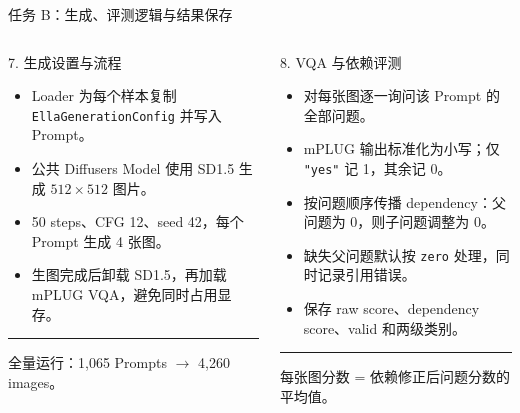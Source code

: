 \documentclass[aspectratio=169,10pt]{beamer}
\begin{document}
\begin{frame}{任务 B：生成、评测逻辑与结果保存}
  \begin{columns}[T,onlytextwidth]
      \begin{block}{7. 生成设置与流程}
        \begin{minipage}[c][5.05cm][c]{\linewidth}
          \begin{itemize}\scriptsize
            \item Loader 为每个样本复制 \texttt{EllaGenerationConfig} 并写入 Prompt。
            \item 公共 Diffusers Model 使用 SD1.5 生成 $512\times512$ 图片。
            \item 50 steps、CFG 12、seed 42，每个 Prompt 生成 4 张图。
            \item 生图完成后卸载 SD1.5，再加载 mPLUG VQA，避免同时占用显存。
          \end{itemize}
          \vspace{0.45em}
          \color{T2IGray}\rule{\linewidth}{0.35pt}\par\vspace{0.3em}
          \scriptsize 全量运行：1,065 Prompts $\rightarrow$ 4,260 images。
        \end{minipage}
      \end{block}

      \begin{block}{8. VQA 与依赖评测}
        \begin{minipage}[c][5.05cm][c]{\linewidth}
          \begin{itemize}\scriptsize
            \item 对每张图逐一询问该 Prompt 的全部问题。
            \item mPLUG 输出标准化为小写；仅 \texttt{"yes"} 记 1，其余记 0。
            \item 按问题顺序传播 dependency：父问题为 0，则子问题调整为 0。
            \item 缺失父问题默认按 \texttt{zero} 处理，同时记录引用错误。
            \item 保存 raw score、dependency score、valid 和两级类别。
          \end{itemize}
          \vspace{0.45em}
          \color{T2IGray}\rule{\linewidth}{0.35pt}\par\vspace{0.3em}
          \scriptsize 每张图分数 = 依赖修正后问题分数的平均值。
        \end{minipage}
      \end{block}


\end{columns}
\end{frame}
\end{document}
